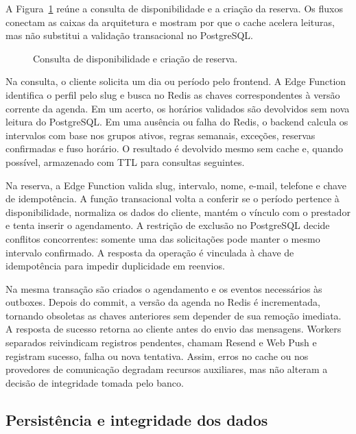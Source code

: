 A Figura~\ref{fig:fluxos} reúne a consulta de disponibilidade e a criação da reserva. Os fluxos conectam as caixas da arquitetura e mostram por que o cache acelera leituras, mas não substitui a validação transacional no PostgreSQL.

\begin{figure}[htbp]
    \centering
    \resizebox{\textwidth}{!}{}
    \caption{Consulta de disponibilidade e criação de reserva.}
    \label{fig:fluxos}
    \fontepropria
\end{figure}

Na consulta, o cliente solicita um dia ou período pelo frontend. A Edge Function identifica o perfil pelo slug e busca no Redis as chaves correspondentes à versão corrente da agenda. Em um acerto, os horários validados são devolvidos sem nova leitura do PostgreSQL. Em uma ausência ou falha do Redis, o backend calcula os intervalos com base nos grupos ativos, regras semanais, exceções, reservas confirmadas e fuso horário. O resultado é devolvido mesmo sem cache e, quando possível, armazenado com TTL para consultas seguintes.

Na reserva, a Edge Function valida slug, intervalo, nome, e-mail, telefone e chave de idempotência. A função transacional volta a conferir se o período pertence à disponibilidade, normaliza os dados do cliente, mantém o vínculo com o prestador e tenta inserir o agendamento. A restrição de exclusão no PostgreSQL decide conflitos concorrentes: somente uma das solicitações pode manter o mesmo intervalo confirmado. A resposta da operação é vinculada à chave de idempotência para impedir duplicidade em reenvios.

Na mesma transação são criados o agendamento e os eventos necessários às outboxes. Depois do commit, a versão da agenda no Redis é incrementada, tornando obsoletas as chaves anteriores sem depender de sua remoção imediata. A resposta de sucesso retorna ao cliente antes do envio das mensagens. Workers separados reivindicam registros pendentes, chamam Resend e Web Push e registram sucesso, falha ou nova tentativa. Assim, erros no cache ou nos provedores de comunicação degradam recursos auxiliares, mas não alteram a decisão de integridade tomada pelo banco.

\subsection{Persistência e integridade dos dados}



